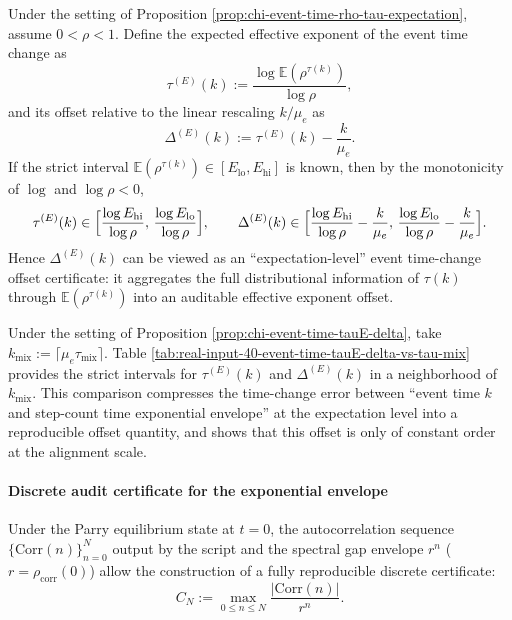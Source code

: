 

\begin{remark}
\label{prop:chi-event-time-tauE-delta}
Under the setting of Proposition \ref{prop:chi-event-time-rho-tau-expectation}, assume $0<\rho<1$.
Define the expected effective exponent of the event time change as
$$
\tau^{(E)}(k):=\frac{\log\mathbb{E}(\rho^{\tau(k)})}{\log\rho},
$$
and its offset relative to the linear rescaling $k/\mu_e$ as
$$
\Delta^{(E)}(k):=\tau^{(E)}(k)-\frac{k}{\mu_e}.
$$
If the strict interval $\mathbb{E}(\rho^{\tau(k)})\in[E_{\mathrm{lo}},E_{\mathrm{hi}}]$ is known, then by the monotonicity of $\log$ and $\log\rho<0$,
$$
\tau^{(E)}(k)\in\Bigl[\frac{\log E_{\mathrm{hi}}}{\log\rho},\,\frac{\log E_{\mathrm{lo}}}{\log\rho}\Bigr],
\qquad
\Delta^{(E)}(k)\in\Bigl[\frac{\log E_{\mathrm{hi}}}{\log\rho}-\frac{k}{\mu_e},\,\frac{\log E_{\mathrm{lo}}}{\log\rho}-\frac{k}{\mu_e}\Bigr].
$$
Hence $\Delta^{(E)}(k)$ can be viewed as an ``expectation-level'' event time-change offset certificate: it aggregates the full distributional information of $\tau(k)$ through $\mathbb{E}(\rho^{\tau(k)})$ into an auditable effective exponent offset.
\end{remark}

\begin{remark}
\label{cor:chi-event-time-tauE-delta-vs-tau-mix}
Under the setting of Proposition \ref{prop:chi-event-time-tauE-delta}, take $k_{\mathrm{mix}}:=\lceil\mu_e\tau_{\mathrm{mix}}\rceil$.
Table \ref{tab:real-input-40-event-time-tauE-delta-vs-tau-mix} provides the strict intervals for $\tau^{(E)}(k)$ and $\Delta^{(E)}(k)$ in a neighborhood of $k_{\mathrm{mix}}$.
This comparison compresses the time-change error between ``event time $k$ and step-count time exponential envelope'' at the expectation level into a reproducible offset quantity, and shows that this offset is only of constant order at the alignment scale.
\end{remark}



\paragraph{Discrete audit certificate for the exponential envelope}
Under the Parry equilibrium state at $t=0$, the autocorrelation sequence $\{\mathrm{Corr}(n)\}_{n=0}^N$ output by the script and the spectral gap envelope $r^n$ ($r=\rho_{\mathrm{corr}}(0)$) allow the construction of a fully reproducible discrete certificate:
\[
C_N:=\max_{0\le n\le N}\frac{|\mathrm{Corr}(n)|}{r^n}.
\]
